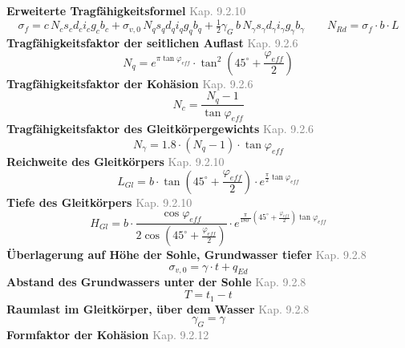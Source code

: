 \documentclass[11pt,a4paper]{article}
\newcommand{\normref}[1]{{\small\textcolor{gray}{#1}}}
\begin{document}
\noindent\textbf{Erweiterte Tragfähigkeitsformel} \hfill \normref{Kap. 9.2.10}
\begin{equation*}
\sigma_f = c \, N_c s_c d_c i_c g_c b_c + \sigma_{v,0} \, N_q s_q d_q i_q g_q b_q + \tfrac{1}{2} \gamma_G \, b \, N_{\gamma} s_{\gamma} d_{\gamma} i_{\gamma} g_{\gamma} b_{\gamma} \qquad N_{Rd} = \sigma_f \cdot b \cdot L
\end{equation*}
\noindent\textbf{Tragfähigkeitsfaktor der seitlichen Auflast} \hfill \normref{Kap. 9.2.6}
\begin{equation*}
N_q = e^{\pi \tan \varphi_{eff}} \cdot \tan^{2}\left(45^\circ + \frac{\varphi_{eff}}{2}\right)
\end{equation*}
\noindent\textbf{Tragfähigkeitsfaktor der Kohäsion} \hfill \normref{Kap. 9.2.6}
\begin{equation*}
N_c = \frac{N_q - 1}{\tan \varphi_{eff}}
\end{equation*}
\noindent\textbf{Tragfähigkeitsfaktor des Gleitkörpergewichts} \hfill \normref{Kap. 9.2.6}
\begin{equation*}
N_{\gamma} = 1.8 \cdot \left(N_q - 1\right) \cdot \tan \varphi_{eff}
\end{equation*}
\noindent\textbf{Reichweite des Gleitkörpers} \hfill \normref{Kap. 9.2.10}
\begin{equation*}
L_{Gl} = b \cdot \tan\left(45^\circ + \frac{\varphi_{eff}}{2}\right) \cdot e^{\frac{\pi}{2} \tan \varphi_{eff}}
\end{equation*}
\noindent\textbf{Tiefe des Gleitkörpers} \hfill \normref{Kap. 9.2.10}
\begin{equation*}
H_{Gl} = b \cdot \frac{\cos \varphi_{eff}}{2 \cos\left(45^\circ + \frac{\varphi_{eff}}{2}\right)} \cdot e^{\frac{\pi}{180^\circ}\left(45^\circ + \frac{\varphi_{eff}}{2}\right) \tan \varphi_{eff}}
\end{equation*}
\noindent\textbf{Überlagerung auf Höhe der Sohle, Grundwasser tiefer} \hfill \normref{Kap. 9.2.8}
\begin{equation*}
\sigma_{v,0} = \gamma \cdot t + q_{Ed}
\end{equation*}
\noindent\textbf{Abstand des Grundwassers unter der Sohle} \hfill \normref{Kap. 9.2.8}
\begin{equation*}
T = t_1 - t
\end{equation*}
\noindent\textbf{Raumlast im Gleitkörper, über dem Wasser} \hfill \normref{Kap. 9.2.8}
\begin{equation*}
\gamma_G = \gamma
\end{equation*}
\noindent\textbf{Formfaktor der Kohäsion} \hfill \normref{Kap. 9.2.12}
\end{document}
